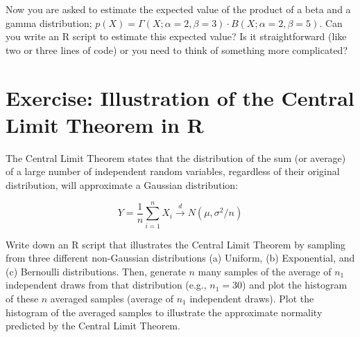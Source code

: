 \documentclass[11pt]{article}
\newif\ifshowanswers
\begin{document}
Now you are asked to estimate the expected value of the product of a beta and a gamma distribution;
$p(X) = \Gamma(X; \alpha=2, \beta=3) \cdot B(X; \alpha=2, \beta=5)$. Can you write an R script to estimate this expected value? Is it straightforward (like two or three lines of code) or you need to think of something more complicated?

\ifshowanswers
  \paragraph{Solution.}
  It is not straightforward.
  The reason is that the product of two distributions is not a standard distribution (one of these that are implemented in common libraries, like R).
  The product of two distributions is a new unnormalized distribution:
  \[
    p(X) = \frac{\Gamma(X; \alpha=2, \beta=3) \cdot B(X; \alpha=2, \beta=5)}{Z}, \text{ where } Z = \int \Gamma(X; \alpha=2, \beta=3) \cdot B(X; \alpha=2, \beta=5) dX
  \]
  Sampling from this distribution is not straightforward; a common approach is to use importance sampling  as we will see in next sessions.

\begin{verbatim}
h <- function(x) dnorm(x, mean = 3, sd = 1) * dexp(x, rate = 1)

sample_h <- function(n) {
  samples <- c()
  M <- 0.4  # Upper bound on h(x) / g(x) where g is Exp(1)
  while (length(samples) < n) {
    x <- rexp(n, rate = 1)
    u <- runif(n)
    accept <- u < h(x) / (M * dexp(x, 1))  # g(x) = dexp(x, 1)
    samples <- c(samples, x[accept])
  }
  return(samples[1:n])
}

set.seed(42)
samples <- sample_h(1000)
hist(samples, breaks = 40, main = "Samples from Gaussian × Exponential")
\end{verbatim}
\fi

\section{Exercise: Illustration of the Central Limit Theorem in R}

The Central Limit Theorem states that the distribution of the sum (or average) of a large number of independent random variables, regardless of their original distribution, will approximate a Gaussian distribution:

\[
  Y = \frac{1}{n} \sum_{i=1}^n X_i \xrightarrow{d} N(\mu, \sigma^2/n)
\]

Write down an R script that illustrates the Central Limit Theorem by sampling from three different non-Gaussian distributions (a) Uniform, (b) Exponential, and (c) Bernoulli distributions. Then, generate \(n\) many samples of the average of \(n_1\) independent draws from that distribution (e.g., \(n_1=30\)) and plot the histogram of these $n$ averaged samples (average of $n_1$ independent draws).
Plot the histogram of the averaged samples to illustrate the approximate normality predicted by the Central Limit Theorem.
\end{document}
